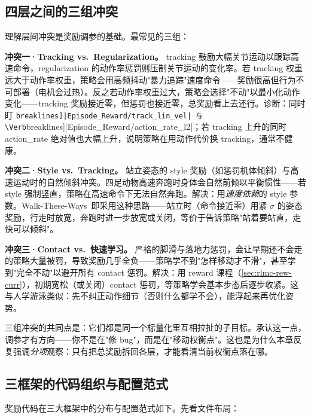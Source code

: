 \subsection{四层之间的三组冲突}
\label{sec:rlmc-rew-conflict}

理解层间冲突是奖励调参的基础。最常见的三组：

\textbf{冲突一·Tracking vs.\ Regularization。} tracking 鼓励大幅关节运动以跟踪高速命令，regularization 的动作率惩罚则压制关节运动的变化率。若 tracking 权重远大于动作率权重，策略会用高频抖动"暴力追踪"速度命令——奖励很高但行为不可部署（电机会过热）。反之若动作率权重过大，策略会选择"不动"以最小化动作变化——tracking 奖励接近零，但惩罚也接近零，总奖励看上去还行。诊断：同时盯 \Verb[breaklines]|Episode_Reward/track_lin_vel| 与 \Verb[breaklines]|Episode_Reward/action_rate_l2|；若 tracking 上升的同时 action\_rate 绝对值也大幅上升，说明策略在用动作代价换 tracking，通常不健康。

\textbf{冲突二·Style vs.\ Tracking。} 站立姿态的 style 奖励（如惩罚机体倾斜）与高速运动时的自然倾斜冲突。四足动物高速奔跑时身体会自然前倾以平衡惯性——若 style 强制竖直，策略在高速命令下无法自然奔跑。解决：用\emph{速度依赖}的 style 参数。Walk-These-Ways\,\cite{margolis2022walk} 即采用这种思路——站立时（命令接近零）用紧 $\sigma$ 的姿态奖励，行走时放宽，奔跑时进一步放宽或关闭，等价于告诉策略"站着要站直，走快可以倾斜"。

\textbf{冲突三·Contact vs.\ 快速学习。} 严格的脚滑与落地力惩罚，会让早期还不会走的策略大量被罚，导致奖励几乎全负——策略学不到"怎样移动才不滑"，甚至学到"完全不动"以避开所有 contact 惩罚。解决：用 reward 课程（\cref{sec:rlmc-rew-curr}），初期宽松（或关闭）contact 惩罚，等策略学会基本步态后逐步收紧。这与人学游泳类似：先不纠正动作细节（否则什么都学不会），能浮起来再优化姿势。

\begin{insight}\label{ins:rlmc-rew-pareto}
三组冲突的共同点是：它们都是同一个标量化里互相拉扯的子目标。承认这一点，调参才有方向——你不是在"修 bug"，而是在"移动权衡点"。这也是为什么本章反复强调\emph{分项}观察：只有把总奖励拆回各层，才能看清当前权衡点落在哪。
\end{insight}

\subsection{三框架的代码组织与配置范式}
\label{sec:rlmc-rew-codeorg}

奖励代码在三大框架中的分布与配置范式如下。先看文件布局：

